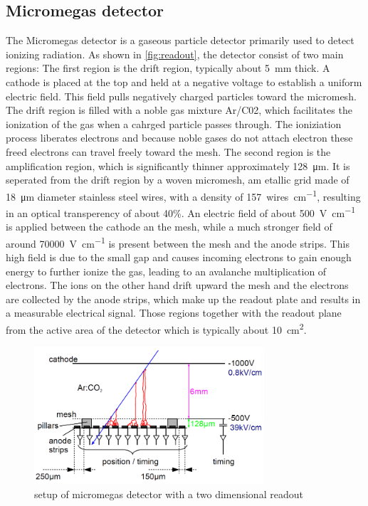 \documentclass[sn-mathphys-num,iicol]{sn-jnl}
\theoremstyle{thmstyleone}
\theoremstyle{thmstyletwo}
\theoremstyle{thmstylethree}
\begin{document}
\subsection{Micromegas detector}
The Micromegas detector is a gaseous particle detector primarily used to detect ionizing radiation. As shown in \autoref{fig:readout}, the detector consist of two main regions: 
The first region is the drift region, typically about \SI{5}{\milli\meter} thick.
A cathode is placed at the top and held at a negative voltage to establish a uniform electric field.
This field pulls negatively charged particles toward the micromesh. The drift region is filled with a noble gas mixture Ar/C02, which facilitates the ionization of the gas when a cahrged particle passes through. The ioniziation process liberates electrons and because noble gases do not attach electron these freed electrons can travel freely toward the mesh. The second region is the amplification region, which is significantly thinner approximately \SI{128}{\micro\meter}. It is seperated from the drift region by a woven micromesh, am etallic grid made of \SI{18}{\micro\meter} diameter stainless steel wires, with a density of \SI{157}{wires\per\cm}, resulting in an optical transperency of about 40\%.
An electric field of about \SI{500}{\volt\per\centi\meter} is applied between the cathode an the mesh, while a much stronger field of around \SI{70000}{\volt\per\centi\meter} is present between the mesh and the anode strips. This high field is due to the small gap and causes incoming electrons to gain enough energy to further ionize the gas, leading to an avalanche multiplication of electrons. The ions on the other hand drift upward the mesh and the electrons are collected by the anode strips, which make up the readout plate and results in a measurable electrical signal. Those regions together with the readout plane from the active area of the detector which is typically about \SI{10}{\centi\meter^2}.
\begin{figure}
  \includegraphics[width=\linewidth]{figures/detector_readout.png}
  \caption{setup of micromegas detector with a two dimensional readout}
  \label{fig:readout}
\end{figure}
\end{document}
